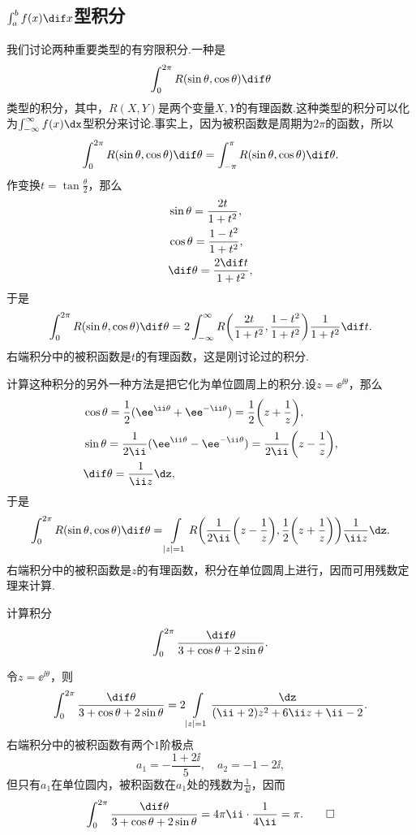 \subsection{\mbox{$\int_a^b f(x){\normalfont\dif }x$}型积分}
我们讨论两种重要类型的有穷限积分.一种是
\[\int_0^{2\pi}R(\sin\theta,\cos\theta)\dif \theta\]
类型的积分，其中，$R(X,Y)$是两个变量$X,Y$的有理函数.这种类型的积分可以化为$\int_{-\infty}^\infty f(x)\dx$型积分来讨论.事实上，因为被积函数是周期为$2\pi$的函数，所以
\[\int_0^{2\pi}R(\sin\theta,\cos\theta)\dif \theta=\int_{-\pi}^{\pi}R(\sin\theta,\cos\theta)\dif \theta.\]
作变换$t=\tan\frac\theta2$，那么
\begin{align*}
&\sin\theta=\frac{2t}{1+t^2},\\
&\cos\theta=\frac{1-t^2}{1+t^2},\\
&\dif \theta=\frac{2\dif t}{1+t^2},
\end{align*}
于是
\[\int_0^{2\pi}R(\sin\theta,\cos\theta)\dif \theta
=2\int_{-\infty}^\infty R\bigg(\frac{2t}{1+t^2},\frac{1-t^2}{1+t^2}\bigg)
\frac1{1+t^2}\dif t.\]
右端积分中的被积函数是$t$的有理函数，这是刚讨论过的积分.

计算这种积分的另外一种方法是把它化为单位圆周上的积分.设$z=\ee^{\ii\theta}$，那么
\begin{align*}
&\cos\theta=\frac12(\ee^{\ii\theta}+\ee^{-\ii\theta})=\frac12\bigg(z+\frac1z\bigg),\\
&\sin\theta=\frac1{2\ii}(\ee^{\ii\theta}-\ee^{-\ii\theta})=\frac1{2\ii}\bigg(z-\frac1z\bigg),\\
&\dif \theta=\frac{1}{\ii z}\dz,
\end{align*}
于是
\[\int_0^{2\pi}R(\sin\theta,\cos\theta)\dif \theta=
\int\limits_{|z|=1}R\bigg(\frac1{2\ii}\bigg(z-\frac1z\bigg),
\frac12\bigg(z+\frac1z\bigg)\bigg)\frac1{\ii z}\dz.\]
右端积分中的被积函数是$z$的有理函数，积分在单位圆周上进行，因而可用残数定理来计算.

\begin{example}\label{exam5.5.13}
计算积分
\[\int_0^{2\pi}\frac{\dif \theta}{3+\cos\theta+2\sin\theta}.\]
\end{example}
\begin{solution}
令$z=\ee^{\ii\theta}$，则
\[\int_0^{2\pi}\frac{\dif \theta}{3+\cos\theta+2\sin\theta}
=2\int\limits_{|z|=1}\frac{\dz}{(\ii+2)z^2+6\ii z+\ii-2}.\]
右端积分中的被积函数有两个$1$阶极点
\[a_1=-\frac{1+2\ii}5,\quad a_2=-1-2\ii,\]
但只有$a_1$在单位圆内，被积函数在$a_1$处的残数为$\frac1{4\ii}$，因而
\begin{equation*}
  \int_0^{2\pi}\frac{\dif \theta}{3+\cos\theta+2\sin\theta}
  = 4\pi\ii\cdot\frac1{4\ii} = \pi. \qedhere
\end{equation*}
\end{solution}

